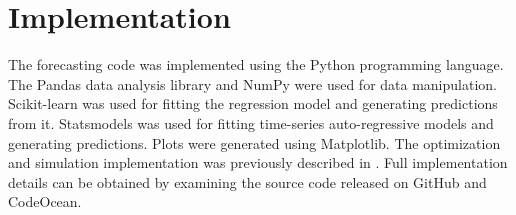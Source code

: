 \section{Implementation}
\label{sec:implementation}

The forecasting code was implemented using the Python programming language\cite{Python3}.
The Pandas\cite{Pandas} data analysis library and NumPy\cite{NumPy} were used for data manipulation.
Scikit-learn\cite{scikit-learn} was used for fitting the regression model and generating predictions from it.
Statsmodels\cite{statsmodels} was used for fitting time-series auto-regressive models and generating predictions.
Plots were generated using Matplotlib\cite{Matplotlib}.
The optimization and simulation implementation was previously described in \cite{Brown2022}.
Full implementation details can be obtained by examining the source code released on GitHub\cite{ISGT2023GithubRepo} and CodeOcean\cite{ISGT2023CodeOceanRepo}.